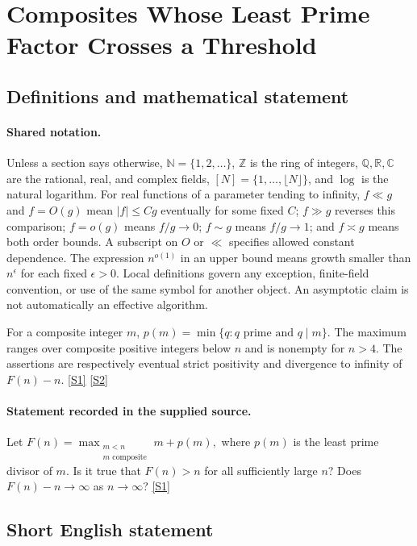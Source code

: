 \documentclass[11pt,a4paper]{article}
\newcommand{\N}{\mathbb{N}}
\newcommand{\Z}{\mathbb{Z}}
\newcommand{\Q}{\mathbb{Q}}
\newcommand{\R}{\mathbb{R}}
\newcommand{\C}{\mathbb{C}}
\newcommand{\sref}[2]{\hyperlink{source:#1:#2}{[S#2]}}
\begin{document}
\section{Composites Whose Least Prime Factor Crosses a Threshold}\label{statement}


\subsection{Definitions and mathematical statement}

\paragraph{Shared notation.}Unless a section says otherwise, $\N=\{1,2,\ldots\}$,
$\Z$ is the ring of integers, $\Q,\R,\C$ are the rational, real, and complex
fields, $[N]=\{1,\ldots,\lfloor N\rfloor\}$, and $\log$ is the natural
logarithm. For real functions of a parameter tending to infinity,
$f\ll g$ and $f=O(g)$ mean $|f|\leq Cg$ eventually for some fixed $C$;
$f\gg g$ reverses this comparison; $f=o(g)$ means $f/g\to0$;
$f\sim g$ means $f/g\to1$; and $f\asymp g$ means both order bounds.
A subscript on $O$ or $\ll$ specifies allowed constant dependence.
The expression $n^{o(1)}$ in an upper bound means growth smaller than
$n^\epsilon$ for each fixed $\epsilon>0$. Local definitions govern any
exception, finite-field convention, or use of the same symbol for another
object. An asymptotic claim is not automatically an effective algorithm.



For a composite integer $m$, $p(m)=\min\{q:q\text{ prime and }q\mid m\}$. The maximum ranges over composite positive integers below $n$ and is nonempty for $n>4$. The assertions are respectively eventual strict positivity and divergence to infinity of $F(n)-n$. \sref{statement}{1} \sref{statement}{2}

\paragraph{Statement recorded in the supplied source.}
Let $ F(n) = \max_{\substack{m<n\\ m\textrm{ composite}}} m+p(m), $ where $p(m)$ is the least prime divisor of $m$. Is it true that $F(n)>n$ for all sufficiently large $n$? Does $F(n)-n\to \infty$ as $n\to\infty$? \sref{statement}{1}

\subsection{Short English statement}
\end{document}
